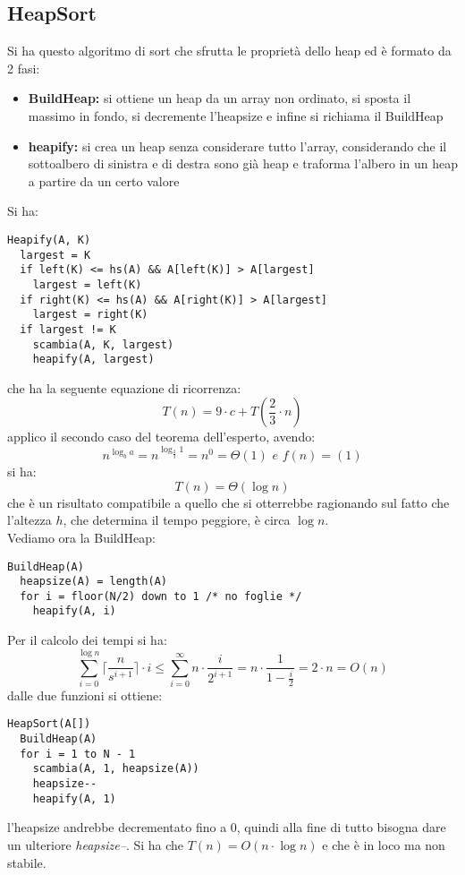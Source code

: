 \documentclass[a4paper,12pt,oneside,tikz]{book}
\begin{document}
\subsection{HeapSort}
Si ha questo algoritmo di sort che sfrutta le proprietà dello heap
ed è formato da 2 fasi:
\begin{itemize}
	\item \textbf{BuildHeap:} si ottiene un heap da un array non ordinato, si sposta il massimo in fondo, si decremente l'heapsize e infine si richiama il BuildHeap
	\item \textbf{heapify:} si crea un heap senza considerare tutto l'array, considerando che il sottoalbero di sinistra e di destra sono già heap e traforma l'albero in un heap a partire da un certo valore
\end{itemize}
Si ha:
\begin{verbatim}
Heapify(A, K)
  largest = K
  if left(K) <= hs(A) && A[left(K)] > A[largest]
    largest = left(K)
  if right(K) <= hs(A) && A[right(K)] > A[largest]
    largest = right(K)
  if largest != K
    scambia(A, K, largest)
    heapify(A, largest)
\end{verbatim}
che ha la seguente equazione di ricorrenza:
$$T(n)=9\cdot c+T\left(\frac{2}{3}\cdot n\right)$$
applico il secondo caso del teorema dell'esperto, avendo:
$$n^{\log_b a}=n^{\log_{\frac{2}{3}} 1}=n^0=\Theta(1)\,\,e\,\, f(n)=(1)$$
si ha:
$$T(n)=\Theta(\log n)$$
che è un risultato compatibile a quello che si otterrebbe ragionando sul fatto che l'altezza $h$, che determina il tempo peggiore, è circa $\log n$.\\
Vediamo ora la BuildHeap:
\begin{verbatim}
BuildHeap(A)
  heapsize(A) = length(A)
  for i = floor(N/2) down to 1 /* no foglie */
    heapify(A, i)
\end{verbatim}
Per il calcolo dei tempi si ha:
$$\sum_{i=0}^{\log n}\big\lceil{\frac{n}{s^{i+1}}}\big\rceil\cdot i\leq \sum_{i=0}^{\infty}n\cdot \frac{i}{2^{i+1}}=n\cdot \frac{1}{1-\frac{i}{2}}=2\cdot n=O(n)$$
dalle due funzioni si ottiene:
\begin{verbatim}
HeapSort(A[])
  BuildHeap(A)
  for i = 1 to N - 1
    scambia(A, 1, heapsize(A))
    heapsize--
    heapify(A, 1)
\end{verbatim}
l'heapsize andrebbe decrementato fino a 0, quindi alla fine di tutto bisogna dare un ulteriore \textit{heapsize--}. Si ha che $T(n)=O(n\cdot \log n)$ e che è in loco ma non stabile.
\end{document}

